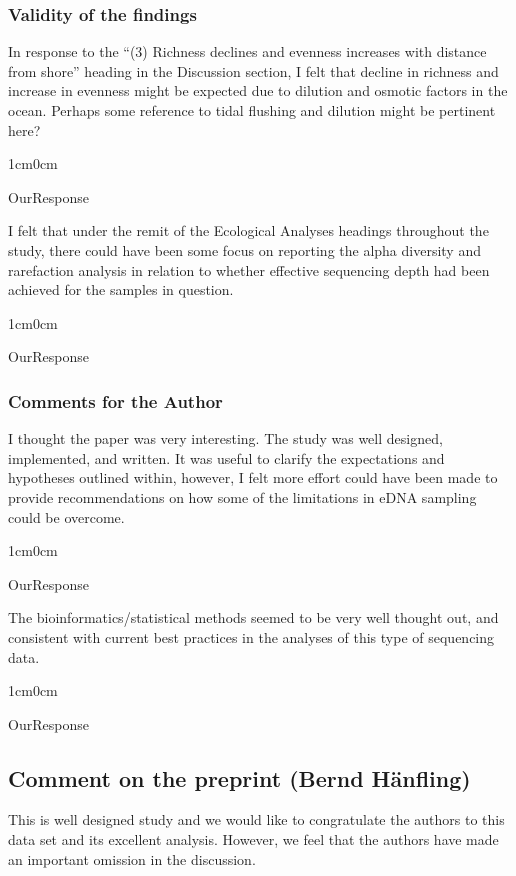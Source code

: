 \documentclass{article}
\newenvironment{response}
	{
	\begin{adjustwidth}{1cm}{0cm}
	\itshape %
	}
	{
	\end{adjustwidth}
	}
\begin{document}
\subsubsection*{Validity of the findings}
In response to the ``(3) Richness declines and evenness increases with distance from shore'' heading in the Discussion section, I felt that decline in richness and increase in evenness might be expected due to dilution and osmotic factors in the ocean. Perhaps some reference to tidal flushing and dilution might be pertinent here?
\begin{response}
  OurResponse\\
\end{response}

I felt that under the remit of the Ecological Analyses headings throughout the study, there could have been some focus on reporting the alpha diversity and rarefaction analysis in relation to whether effective sequencing depth had been achieved for the samples in question.
\begin{response}
  OurResponse\\
\end{response}

\subsubsection{Comments for the Author}
I thought the paper was very interesting. The study was well designed, implemented, and written. It was useful to clarify the expectations and hypotheses outlined within, however, I felt more effort could have been made to provide recommendations on how some of the limitations in eDNA sampling could be overcome.
\begin{response}
  OurResponse\\
\end{response}

The bioinformatics/statistical methods seemed to be very well thought out, and consistent with current best practices in the analyses of this type of sequencing data.
\begin{response}
  OurResponse\\
\end{response}


\subsection*{Comment on the preprint (Bernd Hänfling)}
This is well designed study and we would like to congratulate the authors to this data set and its excellent analysis. However, we feel that the authors have made an important omission in the discussion.
\end{document}
